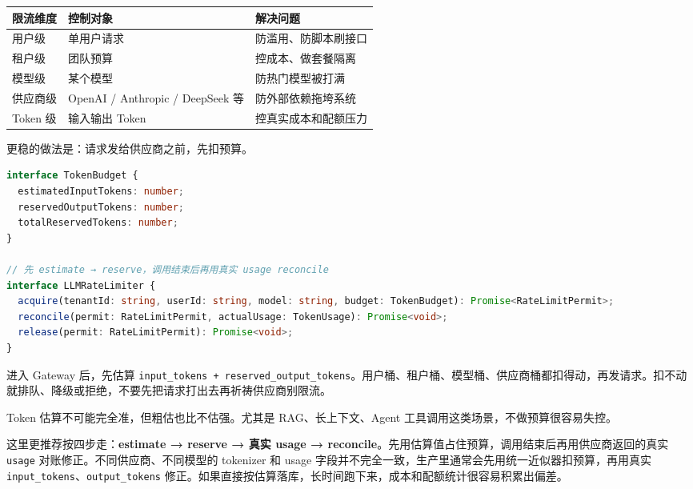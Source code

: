 \documentclass[9pt,a4paper,twocolumn]{ctexart}
\begin{document}
{\footnotesize
\begin{tabular}{|p{}|p{}|p{}|}
\hline
\textbf{限流维度} & \textbf{控制对象} & \textbf{解决问题} \\
\hline
用户级 & 单用户请求 & 防滥用、防脚本刷接口 \\
\hline
租户级 & 团队预算 & 控成本、做套餐隔离 \\
\hline
模型级 & 某个模型 & 防热门模型被打满 \\
\hline
供应商级 & OpenAI / Anthropic / DeepSeek 等 & 防外部依赖拖垮系统 \\
\hline
Token 级 & 输入输出 Token & 控真实成本和配额压力 \\
\hline
\end{tabular}
}



更稳的做法是：请求发给供应商之前，先扣预算。



\begin{lstlisting}[language=TypeScript]
interface TokenBudget {
  estimatedInputTokens: number;
  reservedOutputTokens: number;
  totalReservedTokens: number;
}

// 先 estimate → reserve，调用结束后再用真实 usage reconcile
interface LLMRateLimiter {
  acquire(tenantId: string, userId: string, model: string, budget: TokenBudget): Promise<RateLimitPermit>;
  reconcile(permit: RateLimitPermit, actualUsage: TokenUsage): Promise<void>;
  release(permit: RateLimitPermit): Promise<void>;
}
\end{lstlisting}



进入 Gateway 后，先估算 \texttt{input\_tokens + reserved\_output\_tokens}。用户桶、租户桶、模型桶、供应商桶都扣得动，再发请求。扣不动就排队、降级或拒绝，不要先把请求打出去再祈祷供应商别限流。



Token 估算不可能完全准，但粗估也比不估强。尤其是 RAG、长上下文、Agent 工具调用这类场景，不做预算很容易失控。



这里更推荐按四步走：\textbf{estimate → reserve → 真实 usage → reconcile}。先用估算值占住预算，调用结束后再用供应商返回的真实 \texttt{usage} 对账修正。不同供应商、不同模型的 tokenizer 和 usage 字段并不完全一致，生产里通常会先用统一近似器扣预算，再用真实 \texttt{input\_tokens}、\texttt{output\_tokens} 修正。如果直接按估算落库，长时间跑下来，成本和配额统计很容易积累出偏差。
\end{document}
